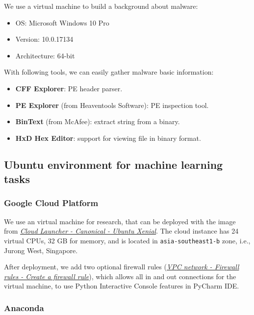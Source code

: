 We use a virtual machine to build a background about malware:

\begin{itemize}
\item OS: Microsoft Windows 10 Pro
\item Version: 10.0.17134
\item Architecture: 64-bit
\end{itemize}

With following tools, we can easily gather malware basic information:

\begin{itemize}
 \item \textbf{CFF Explorer}: PE header parser.
 \item \textbf{PE Explorer} (from Heaventools Software): PE inspection tool.
 \item \textbf{BinText} (from McAfee): extract string from a binary.
 \item \textbf{HxD Hex Editor}: support for viewing file in binary format.
\end{itemize}

\subsection{Ubuntu environment for machine learning tasks}

\subsubsection{Google Cloud Platform}

We use an virtual machine for research, that can be deployed with the image from \textit{\href{https://console.cloud.google.com/launcher/details/ubuntu-os-cloud/ubuntu-xenial}{Cloud Launcher - Canonical - Ubuntu Xenial}}. The cloud instance has 24 virtual CPUs, 32 GB for memory, and is located in \verb|asia-southeast1-b| zone, i.e., Jurong West, Singapore.

After deployment, we add two optional firewall rules (\textit{\href{https://console.cloud.google.com/networking/firewalls/add}{VPC network - Firewall rules - Create a firewall rule}}), which allows all in and out connections for the virtual machine, to use Python Interactive Console features in PyCharm IDE.

\subsubsection{Anaconda}

